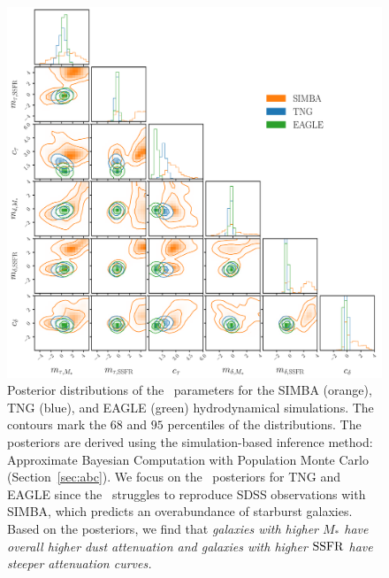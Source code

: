 \begin{figure}
\begin{center}
    \includegraphics[width=\textwidth]{figs/abc.pdf}
    \caption{\label{fig:abc}
    Posterior distributions of the \eda~parameters for the SIMBA (orange), TNG
    (blue), and EAGLE (green) hydrodynamical simulations. The contours mark the $68$
    and $95$ percentiles of the distributions. The posteriors are derived using the
    simulation-based inference method: Approximate Bayesian Computation with
    Population Monte Carlo (Section~\ref{sec:abc}). We focus on the
    \eda~posteriors for TNG and EAGLE since the \eda~struggles to reproduce
    SDSS observations with SIMBA, which predicts an overabundance of starburst
    galaxies. Based on the posteriors, we find that \emph{galaxies with higher
    $M_*$ have overall higher dust attenuation and galaxies with higher ${\rm SSFR}$
    have steeper attenuation curves.}
    }
\end{center}
\end{figure}

